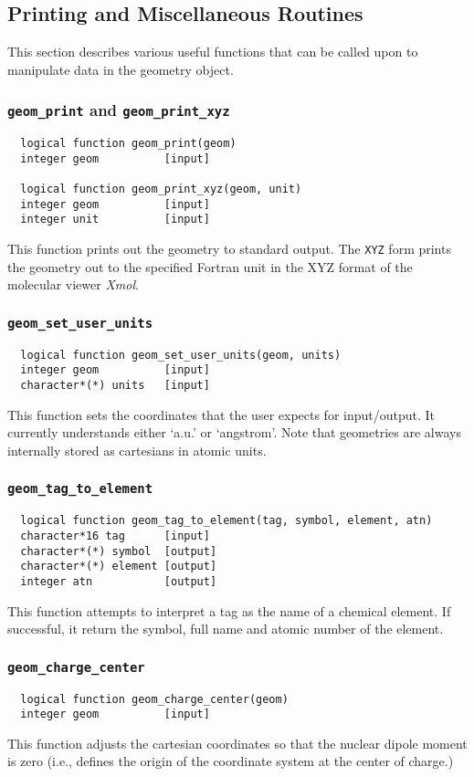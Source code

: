 \subsection{Printing and Miscellaneous Routines}

This section describes various useful functions that can be called upon to
manipulate data in the geometry object.

\subsubsection{{\tt geom\_print} and {\tt geom\_print\_xyz}}
\begin{verbatim}
  logical function geom_print(geom)
  integer geom          [input]

  logical function geom_print_xyz(geom, unit)
  integer geom          [input]
  integer unit          [input]
\end{verbatim}
This function prints out the geometry to standard output.  The {\tt XYZ} form prints
the geometry out to the specified Fortran unit in the XYZ format of 
the molecular viewer {\em Xmol}.

\subsubsection{{\tt geom\_set\_user\_units}}
\begin{verbatim}
  logical function geom_set_user_units(geom, units)
  integer geom          [input]
  character*(*) units   [input]
\end{verbatim}
This function sets the coordinates that the user expects for input/output.  It
currently understands either `a.u.' or `angstrom'.  Note that
geometries are always internally stored as cartesians in atomic units.

\subsubsection{{\tt geom\_tag\_to\_element}}
\begin{verbatim}
  logical function geom_tag_to_element(tag, symbol, element, atn)
  character*16 tag      [input]
  character*(*) symbol  [output]
  character*(*) element [output]
  integer atn           [output]
\end{verbatim}
This function attempts to interpret a tag as the name of a chemical element.  If successful,
it return the symbol, full name and atomic number of the element.

\subsubsection{{\tt geom\_charge\_center}}
\begin{verbatim}
  logical function geom_charge_center(geom)
  integer geom          [input]
\end{verbatim}
This function adjusts the cartesian coordinates so that the nuclear dipole moment is
zero (i.e., defines the origin of the coordinate system at the center of
charge.)

